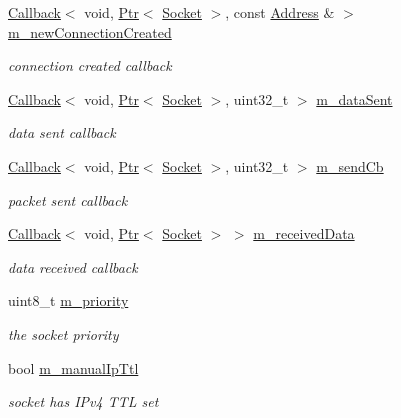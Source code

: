 \begin{DoxyCompactItemize}
\hyperlink{classns3_1_1Callback}{Callback}$<$ void, \hyperlink{classns3_1_1Ptr}{Ptr}$<$ \hyperlink{classns3_1_1Socket}{Socket} $>$, const \hyperlink{classns3_1_1Address}{Address} \& $>$ \hyperlink{classns3_1_1Socket_acc065ce65a4c63ce212d07987a9beb37}{m\+\_\+new\+Connection\+Created}
\begin{DoxyCompactList}\small\item\em connection created callback \end{DoxyCompactList}\item 
\hyperlink{classns3_1_1Callback}{Callback}$<$ void, \hyperlink{classns3_1_1Ptr}{Ptr}$<$ \hyperlink{classns3_1_1Socket}{Socket} $>$, uint32\+\_\+t $>$ \hyperlink{classns3_1_1Socket_ad55ae6865f79d151176e1014c6ac5b0e}{m\+\_\+data\+Sent}
\begin{DoxyCompactList}\small\item\em data sent callback \end{DoxyCompactList}\item 
\hyperlink{classns3_1_1Callback}{Callback}$<$ void, \hyperlink{classns3_1_1Ptr}{Ptr}$<$ \hyperlink{classns3_1_1Socket}{Socket} $>$, uint32\+\_\+t $>$ \hyperlink{classns3_1_1Socket_acafb95acab16c54a933f8e28dabfbadf}{m\+\_\+send\+Cb}
\begin{DoxyCompactList}\small\item\em packet sent callback \end{DoxyCompactList}\item 
\hyperlink{classns3_1_1Callback}{Callback}$<$ void, \hyperlink{classns3_1_1Ptr}{Ptr}$<$ \hyperlink{classns3_1_1Socket}{Socket} $>$ $>$ \hyperlink{classns3_1_1Socket_ab04cba5133e96fef09ca9bad8a864243}{m\+\_\+received\+Data}
\begin{DoxyCompactList}\small\item\em data received callback \end{DoxyCompactList}\item 
uint8\+\_\+t \hyperlink{classns3_1_1Socket_a19f31446cdeb7ed8f68778d14525941b}{m\+\_\+priority}
\begin{DoxyCompactList}\small\item\em the socket priority \end{DoxyCompactList}\item 
bool \hyperlink{classns3_1_1Socket_acfae11c5bc1df294d7a27bd1fda80bfd}{m\+\_\+manual\+Ip\+Ttl}
\begin{DoxyCompactList}\small\item\em socket has I\+Pv4 T\+TL set \end{DoxyCompactList}\item 

\end{DoxyCompactItemize}
